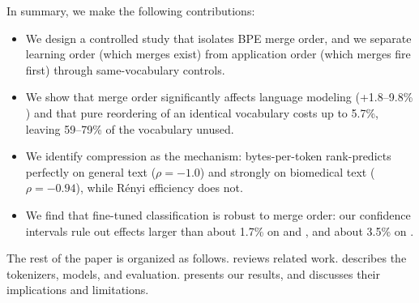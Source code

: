In summary, we make the following contributions:
\begin{itemize}[leftmargin=*,itemsep=0pt,topsep=0pt]
    \item We design a controlled study that isolates BPE merge order, and we separate learning order (which merges exist) from application order (which merges fire first) through same-vocabulary controls.
    \item We show that merge order significantly affects language modeling (+1.8--9.8\% \bpb) and that pure reordering of an identical vocabulary costs up to 5.7\%, leaving 59--79\% of the vocabulary unused.
    \item We identify compression as the mechanism: bytes-per-token rank-predicts \bpb perfectly on general text ($\rho=-1.0$) and strongly on biomedical text ($\rho=-0.94$), while R\'enyi efficiency does not.
    \item We find that fine-tuned classification is robust to merge order: our confidence intervals rule out effects larger than about 1.7\% on \agnews and \pubmedrct, and about 3.5\% on \sst.
\end{itemize}

The rest of the paper is organized as follows.
 reviews related work.
 describes the tokenizers, models, and evaluation.
 presents our results, and  discusses their implications and limitations.
